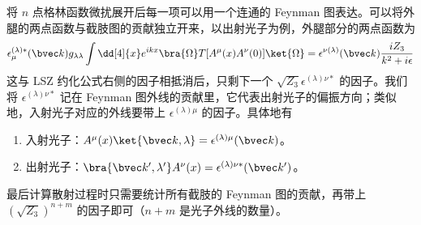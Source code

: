 将 $n$ 点格林函数微扰展开后每一项可以用一个连通的 Feynman 图表达。可以将外腿的两点函数与截肢图的贡献独立开来，以出射光子为例，外腿部分的两点函数为
\[
\epsilon_\mu^{(\lambda)*}(\bvec k)g_{\lambda\lambda}\int \dd[4]{x} e^{ikx} \bra{\Omega}T[A^\mu(x)A^\nu(0)]\ket{\Omega}= \epsilon^{\nu(\lambda)}(\bvec k)\frac{iZ_3}{k^2+i\epsilon}
\]
这与 LSZ 约化公式右侧的因子相抵消后，只剩下一个 $\sqrt{Z_3}\epsilon^{ (\lambda)\nu*}$ 的因子。我们将 $\epsilon^{(\lambda)\nu*}$ 记在 Feynman 图外线的贡献里，它代表出射光子的偏振方向；类似地，入射光子对应的外线要带上 $\epsilon^{(\lambda)\mu}$ 的因子。具体地有
\begin{enumerate}
\item 入射光子：$A^\mu(x) \ket{\bvec k,\lambda}=\epsilon^{(\lambda)\mu}(\bvec k)$。
\item 出射光子：$\bra{\bvec k',\lambda'}A^\nu(x)=\epsilon^{(\lambda)\nu*}(\bvec k')$。
\end{enumerate}
最后计算散射过程时只需要统计所有截肢的 Feynman 图的贡献，再带上 $(\sqrt{Z_3})^{n+m}$ 的因子即可（$n+m$ 是光子外线的数量）。
